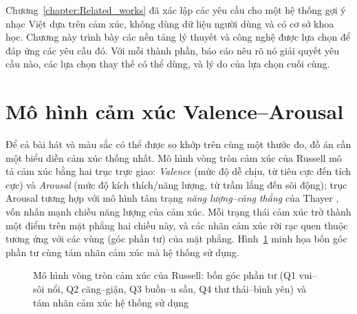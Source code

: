 \documentclass[../DoAn.tex]{subfiles}
\begin{document}
Chương~\ref{chapter:Related_works} đã xác lập các yêu cầu cho một hệ thống gợi ý nhạc Việt dựa trên cảm xúc, không dùng dữ liệu người dùng và có cơ sở khoa học. Chương này trình bày các nền tảng lý thuyết và công nghệ được lựa chọn để đáp ứng các yêu cầu đó. Với mỗi thành phần, báo cáo nêu rõ nó giải quyết yêu cầu nào, các lựa chọn thay thế có thể dùng, và lý do của lựa chọn cuối cùng.

\section{Mô hình cảm xúc Valence--Arousal}
\label{section:3.1}
Để cả bài hát và màu sắc có thể được so khớp trên cùng một thước đo, đồ án cần một biểu diễn cảm xúc thống nhất. Mô hình vòng tròn cảm xúc của Russell \cite{russell1980circumplex} mô tả cảm xúc bằng hai trục trực giao: \textit{Valence} (mức độ dễ chịu, từ tiêu cực đến tích cực) và \textit{Arousal} (mức độ kích thích/năng lượng, từ trầm lắng đến sôi động); trục Arousal tương hợp với mô hình tâm trạng \textit{năng lượng--căng thẳng} của Thayer \cite{thayer1989biopsychology}, vốn nhấn mạnh chiều năng lượng của cảm xúc. Mỗi trạng thái cảm xúc trở thành một điểm trên mặt phẳng hai chiều này, và các nhãn cảm xúc rời rạc quen thuộc tương ứng với các vùng (góc phần tư) của mặt phẳng. Hình~\ref{fig:circumplex} minh họa bốn góc phần tư cùng tám nhãn cảm xúc mà hệ thống sử dụng.

\begin{figure}[tbp]
\centering
{}
\caption{Mô hình vòng tròn cảm xúc của Russell: bốn góc phần tư (Q1 vui--sôi nổi, Q2 căng--giận, Q3 buồn--u sầu, Q4 thư thái--bình yên) và tám nhãn cảm xúc hệ thống sử dụng}
\label{fig:circumplex}
\end{figure}
\end{document}
